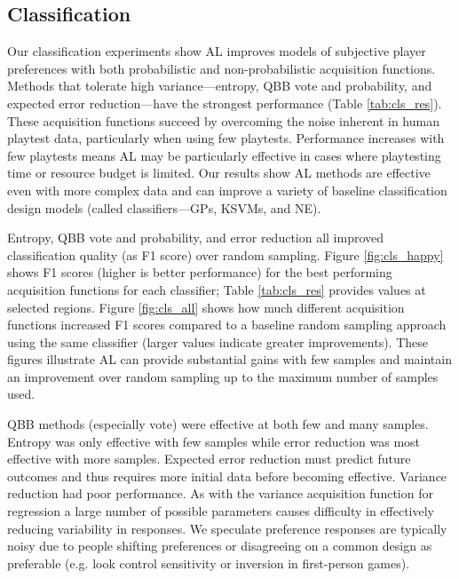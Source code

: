 \documentclass{sig-alternate}
\begin{document}
\subsection{Classification}
Our classification experiments show AL improves models of subjective player preferences with both probabilistic and non-probabilistic acquisition functions.
Methods that tolerate high variance---entropy, QBB vote and probability, and expected error reduction---have the strongest performance (Table \ref{tab:cls_res}).
These acquisition functions succeed by overcoming the noise inherent in human playtest data, particularly when using few playtests.
Performance increases with few playtests means AL may be particularly effective in cases where playtesting time or resource budget is limited.
Our results show AL methods are effective even with more complex data and can improve a variety of baseline classification design models (called classifiers---GPs, KSVMs, and NE).



Entropy, QBB vote and probability, and error reduction all improved classification quality (as F1 score) over random sampling.
Figure \ref{fig:cls_happy} shows F1 scores (higher is better performance) for the best performing acquisition functions for each classifier; Table \ref{tab:cls_res} provides values at selected regions.
Figure \ref{fig:cls_all} shows how much different acquisition functions increased F1 scores compared to a baseline random sampling approach using the same classifier (larger values indicate greater improvements).
These figures illustrate AL can provide substantial gains with few samples and maintain an improvement over random sampling up to the maximum number of samples used.

QBB methods (especially vote) were effective at both few and many samples.
Entropy was only effective with few samples while error reduction was most effective with more samples.
Expected error reduction must predict future outcomes and thus requires more initial data before becoming effective.
Variance reduction had poor performance.
As with the variance acquisition function for regression a large number of possible parameters causes difficulty in effectively reducing variability in responses.
We speculate preference responses are typically noisy due to people shifting preferences or disagreeing on a common design as preferable (e.g. look control sensitivity or inversion in first-person games).
\end{document}
